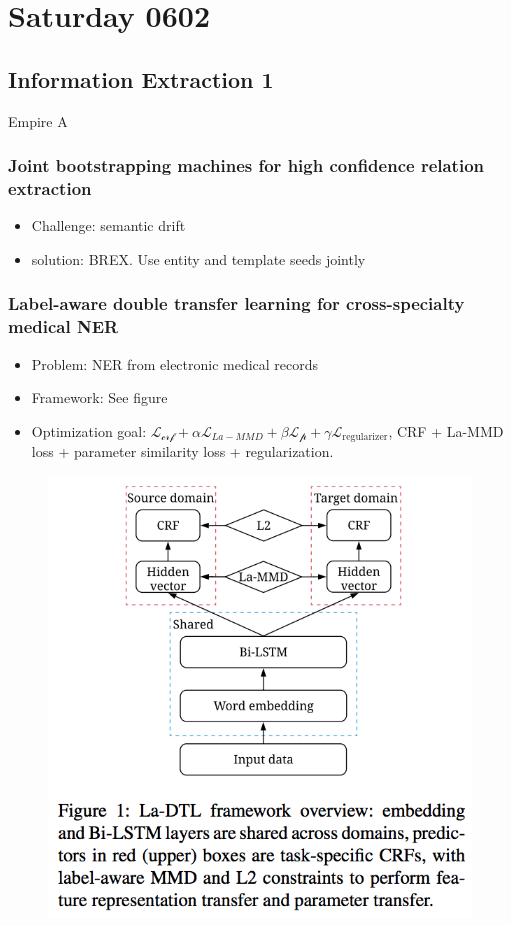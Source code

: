 \section{Saturday 0602}


\subsection{Information Extraction 1}
Empire A

\subsubsection{\cite{Gupta2018Joint} Joint bootstrapping machines for high confidence relation extraction}
\begin{itemize}
	\item Challenge: semantic drift
	\item solution: BREX. Use entity and template seeds jointly
\end{itemize}

\subsubsection{\cite{Wang2018Label-Aware} Label-aware double transfer learning for cross-specialty medical NER}
\begin{itemize}
	\item Problem: NER from electronic medical records
	\item Framework: See figure
	\item Optimization goal: $\mathcal{L_{crf}} + \alpha \mathcal{L}_{La-MMD} + \beta \mathcal{L_p} + \gamma \mathcal{L}_{\text{regularizer}}$, CRF + La-MMD loss + parameter similarity loss + regularization.
\end{itemize}
\begin{figure}[h]
	\centering
	\includegraphics[scale=0.9]{fig0602/LA-MMD}
\end{figure}

